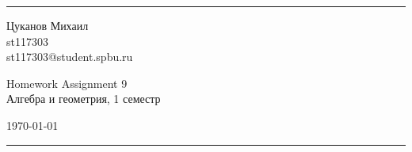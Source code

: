 \documentclass[a4paper, 12pt]{article}
\begin{document}

\fancyhead[C]{}
\hrule \medskip %
\begin{minipage}{0.295\textwidth}
\raggedright\footnotesize
Цуканов Михаил \hfill\\
st117303 \hfill\\
st117303@student.spbu.ru
\end{minipage}
\begin{minipage}{0.4\textwidth}
\centering\large
Homework Assignment 9\\
\normalsize
Алгебра и геометрия, 1 семестр\\
\end{minipage}
\begin{minipage}{0.295\textwidth}
\raggedleft
\today\hfill\\
\end{minipage}
\medskip\hrule
\bigskip

\end{document}
